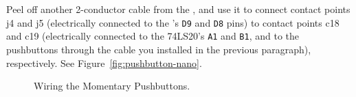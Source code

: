Peel off another 2-conductor cable from the \rainbow, and use it to connect
contact points j4 and j5 (electrically connected to the \nano's \texttt{D9} and
\texttt{D8} pins) to contact points c18 and c19 (electrically connected to the
74LS20's \texttt{A1} and \texttt{B1}, and to the pushbuttons through the cable
you installed in the previous paragraph), respectively. See
Figure~\ref{fig:pushbutton-nano}.

\begin{figure}\begin{multicols}{2}
    \centering
    \columnbreak


    \end{multicols}
    \caption{Wiring the Momentary Pushbuttons.}
\end{figure}

